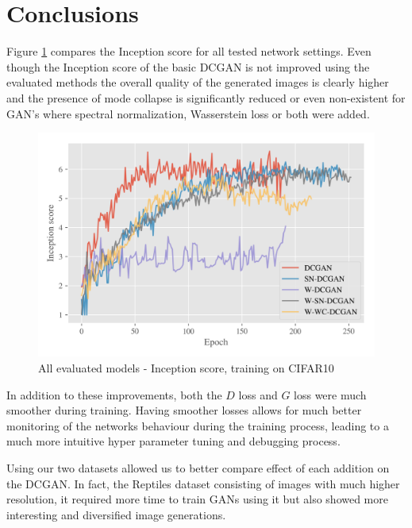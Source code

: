 
\section{Conclusions}
Figure  \ref{fig:exp-all-is} compares the Inception score for all tested network settings. Even though the Inception score of the basic DCGAN is not improved using the evaluated methods the overall quality of the generated images is clearly higher and the presence of mode collapse is significantly reduced or even non-existent for GAN's where spectral normalization, Wasserstein loss or both were added. 
\begin{figure}[H]
\centering
\includegraphics[width=\textwidth]{../code/results/figures/all_cifar10_is.png}
\caption{All evaluated models - Inception score, training on CIFAR10}
\label{fig:exp-all-is}
\end{figure}
In addition to these improvements, both the $D$ loss and $G$ loss were much smoother during training. Having smoother losses allows for much better monitoring of the networks behaviour during the training process, leading to a much more intuitive hyper parameter tuning and debugging process. 

Using our two datasets allowed us to better compare effect of each addition on the DCGAN. In fact, the Reptiles dataset consisting of images with much higher resolution, it required more time to train GANs using it but also showed more interesting and diversified image generations. 



